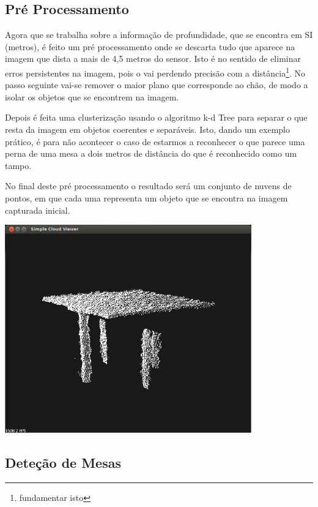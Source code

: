 \subsection{Pré Processamento}

Agora que se trabalha sobre a informação de profundidade, que se encontra em SI (metros), é feito um pré processamento onde se descarta tudo que aparece na imagem que dista a mais de 4,5 metros do sensor. Isto é no sentido de eliminar erros persistentes na imagem, pois o  vai perdendo precisão com a distância\footnote{fundamentar isto}. No passo seguinte vai-se remover o maior plano que corresponde ao chão, de modo a isolar os objetos que se encontrem na imagem.


Depois é feita uma clusterização usando o algoritmo k-d Tree para separar o que resta da imagem em objetos coerentes e separáveis. Isto, dando um exemplo prático, é para não acontecer o caso de estarmos a reconhecer o que parece uma perna de uma mesa a dois metros de distância do que é reconhecido como um tampo.

No final deste pré processamento o resultado será um conjunto de nuvens de pontos, em que cada uma representa um objeto que se encontra na imagem capturada inicial.


\begin{center}
	\includegraphics[width=0.80\textwidth]{figures/exemplo_mesa2.png}
	\label{fig:exemplo_processado}
\end{center}


\subsection{Deteção de Mesas}

